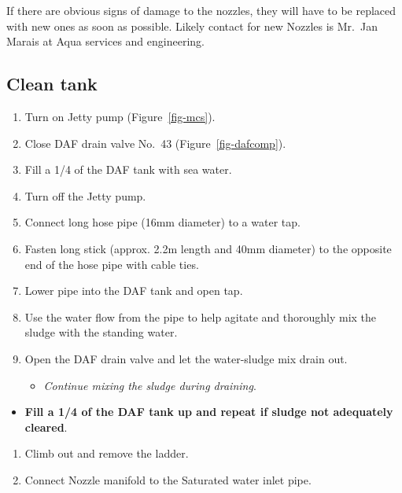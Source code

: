 \documentclass[
  12pt,
]{report}
\providecommand{\tightlist}{%
  \setlength{\itemsep}{0pt}\setlength{\parskip}{0pt}}\usepackage{longtable,booktabs,array}
\begin{document}
{If there are obvious signs of damage to the nozzles, they will have to
be replaced with new ones as soon as possible}. {Likely contact for new
Nozzles is Mr.~Jan Marais at Aqua services and engineering}.

\hypertarget{sec-clean-daf-tank}{%
\subsection{Clean tank}\label{sec-clean-daf-tank}}

\begin{enumerate}
\def\labelenumi{\arabic{enumi}.}
\setcounter{enumi}{23}
\tightlist
\item
  Turn on Jetty pump (Figure~\ref{fig-mcs}).
\item
  Close DAF drain valve No.~43 (Figure~\ref{fig-dafcomp}).
\item
  Fill a 1/4 of the DAF tank with sea water.
\item
  Turn off the Jetty pump.
\item
  Connect long hose pipe (16mm diameter) to a water tap.
\item
  Fasten long stick (approx. 2.2m length and 40mm diameter) to the
  opposite end of the hose pipe with cable ties.
\item
  Lower pipe into the DAF tank and open tap.
\item
  Use the water flow from the pipe to help agitate and thoroughly mix
  the sludge with the standing water.
\item
  Open the DAF drain valve and let the water-sludge mix drain out.

  \begin{itemize}
  \tightlist
  \item
    \emph{Continue mixing the sludge during draining}.
  \end{itemize}
\end{enumerate}

\begin{itemize}
\tightlist
\item
  \textbf{Fill a 1/4 of the DAF tank up and repeat if sludge not
  adequately cleared}.
\end{itemize}

\begin{enumerate}
\def\labelenumi{\arabic{enumi}.}
\setcounter{enumi}{32}
\tightlist
\item
  Climb out and remove the ladder.
\item
  Connect Nozzle manifold to the Saturated water inlet pipe.
\end{enumerate}
\end{document}
